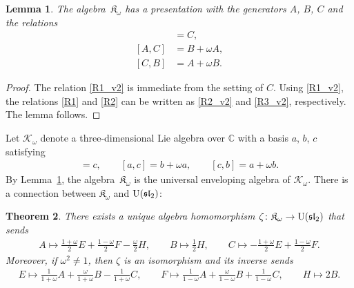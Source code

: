 \documentclass[10pt,a4paper]{amsart}
\def\C{\mathbb C}
\def\K{\mathfrak K_\omega}
\def\U{{\rm U}(\mathfrak{sl}_2)}
\numberwithin{equation}{section}
\newtheorem{Theorem}{Theorem}[section]
\newtheorem{Lemma}[Theorem]{Lemma}
\begin{document}
\begin{Lemma}\label{lem:presentation_K}
The algebra~$\K$ has a presentation with the generators $A$, $B$, $C$ and the relations
\begin{align}
[A,B] &=C,
\label{R1_v2}
\\
[A,C]&=B+\omega A,
\label{R2_v2}
\\
[C,B]&=A+\omega B.
\label{R3_v2}
\end{align}
\end{Lemma}
\begin{proof}
The relation \eqref{R1_v2} is immediate from the setting of $C$. Using \eqref{R1_v2}, the relations \eqref{R1} and \eqref{R2} can be written as \eqref{R2_v2} and \eqref{R3_v2}, respectively. The lemma follows.
\end{proof}




Let $\mathcal K_\omega$ denote a three-dimensional Lie algebra over $\C$ with a basis $a$, $b$, $c$ satisfying
\begin{gather*}
[a,b]=c,
\qquad
[a,c]=b+\omega a,
\qquad
[c,b]=a+\omega b.
\end{gather*}
By Lemma~\ref{lem:presentation_K}, the algebra~$\K$ is the universal enveloping algebra of $\mathcal K_\omega$. There is a connection between $\K$ and $\U$:

\begin{Theorem}\label{thm:KtoU}
There exists a unique algebra homomorphism $\zeta\colon \K\to \U$ that sends
\begin{gather*}
A\mapsto \frac{1+\omega}{2} E+\frac{1-\omega}{2} F-\frac{\omega}{2}H,
\qquad
B\mapsto \frac{1}{2} H,
\qquad
C\mapsto -\frac{1+\omega}{2} E+\frac{1-\omega}{2} F.
\end{gather*}
Moreover, if $\omega^2\not=1$, then $\zeta$ is an isomorphism and its inverse sends
\begin{gather*}
E\mapsto \frac{1}{1+\omega}A+\frac{\omega}{1+\omega} B-\frac{1}{1+\omega}C,
\qquad
F\mapsto \frac{1}{1-\omega}A+\frac{\omega}{1-\omega} B+\frac{1}{1-\omega}C,
\qquad
H\mapsto 2 B.
\end{gather*}
\end{Theorem}
\end{document}
